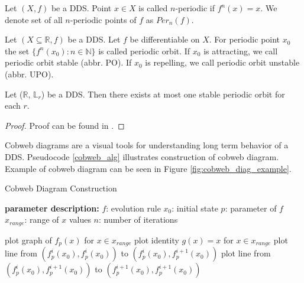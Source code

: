 \begin{definition}
    Let $(X, f)$ be a DDS. Point $x \in X$ is called $n$-periodic if $f^{n}(x)=x$.
    We denote set of all $n$-periodic points of $f$ as $Per_{n}(f)$. \cite{Devaney20211026}
\end{definition}

\begin{definition}
    Let $(X \subseteq \mathbb{R}, f)$ be a DDS. Let $f$ be differentiable on $X$. For periodic point $x_0$ the set $\{f^{n}(x_0):n \in \mathbb{N}\}$ is called periodic orbit.
    If $x_0$ is attracting, we call periodic orbit stable (abbr. PO).
    If $x_0$ is repelling, we call periodic orbit unstable (abbr. UPO).
\end{definition}

\begin{theorem}
    Let ($\mathbb{R}$, $\mathbb{L}_r$) be a DDS. Then there exists at most one stable periodic orbit for each $r$. \cite[p.~74]{Devaney20211026}
\end{theorem}

\begin{proof}
    Proof can be found in \cite[p.~74]{Devaney20211026}.
\end{proof}

\label{def:cobweb}
\begin{remark}
    Cobweb diagrams are a visual tools for understanding long term behavior of a DDS.
    Pseudocode \ref{cobweb_alg} illustrates construction of cobweb diagram.
    Example of cobweb diagram can be seen in Figure \ref{fig:cobweb_diag_example}.
\end{remark}

\begin{algorithm}
\caption{Cobweb Diagram Construction}\label{cobweb_alg}
\begin{algorithmic}[1]
\Statex \textbf{parameter description:}
\Statex $f$: evolution rule
\Statex $x_0$: initial state
\Statex $p$: parameter of $f$
\Statex $x_{range}$: range of $x$ values
\Statex $n$: number of iterations
\Statex

\State plot graph of $f_p(x)$ for $x \in x_{range}$
\State plot identity $g(x)=x$ for $x \in x_{range}$
\State plot line from $(f_{p}^{i}(x_0), f_{p}^{i}(x_0))$ to $(f_{p}^{i}(x_0), f_{p}^{i+1}(x_0))$
\State plot line from $(f_{p}^{i}(x_0), f_{p}^{i+1}(x_0))$ to $(f_{p}^{i+1}(x_0), f_{p}^{i+1}(x_0))$
\EndFor
\EndFunction

\end{algorithmic}
\end{algorithm}

